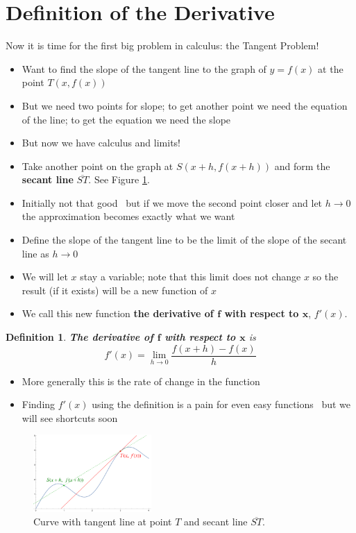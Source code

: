 \documentclass[letterpaper, 11pt, openany]{book}
\theoremstyle{mytheoremstyle}
\newtheorem{definition}{Definition}[section]
\theoremstyle{myexamplestyle}
\begin{document}
\section{Definition of the Derivative}

Now it is time for the first big problem in calculus: the Tangent Problem!
\begin{itemize}
    \item Want to find the slope of the tangent line to the graph of \(y = f(x)\) at the point \( T(x, f(x))\)
    \item But we need two points for slope; to get another point we need the equation of the line; to get the equation we need the slope \faFrown
    \item But now we have calculus and limits! \faSmile
    \item Take another point on the graph at \(S(x+h, f(x+h))\) and form the \textbf{secant line} \(\overline{ST}\). See Figure \ref{f:tan-sec-lines}.
    \item Initially not that good \faFrown \, but if we move the second point closer and let \(h \to 0\) the approximation becomes exactly what we want \faSmile
    \item Define the slope of the tangent line to be the limit of the slope of the secant line as \(h \to 0\)
    \item We will let \(x\) stay a variable; note that this limit does not change \(x\) so the result (if it exists) will be a new function of \(x\)
    \item We call this new function \textbf{the derivative of \(\bm{f}\) with respect to \(\bm{x}\)}, \(f'(x)\).
\end{itemize}
\begin{definition}\label{d:derivative}
    \textbf{The derivative of \(\bm{f}\) with respect to \(\bm{x}\)} is
    \[f'(x) = \lim_{h \to 0} \frac{f(x+h) - f(x)}{h}\]
\end{definition}
\begin{itemize}
    \item More generally this is the rate of change in the function
    \item Finding \(f'(x)\) using the definition is a pain for even easy functions \faFrown \, but we will see shortcuts soon \faSmile
\end{itemize}
\begin{figure}[htbp]
    \centering
        \includegraphics[width=0.4\textwidth]{Figures/tangentline.pdf}
    \caption{Curve with tangent line at point \(T\) and secant line \(\overline{ST}\).}
    \label{f:tan-sec-lines}
\end{figure}
\end{document}
